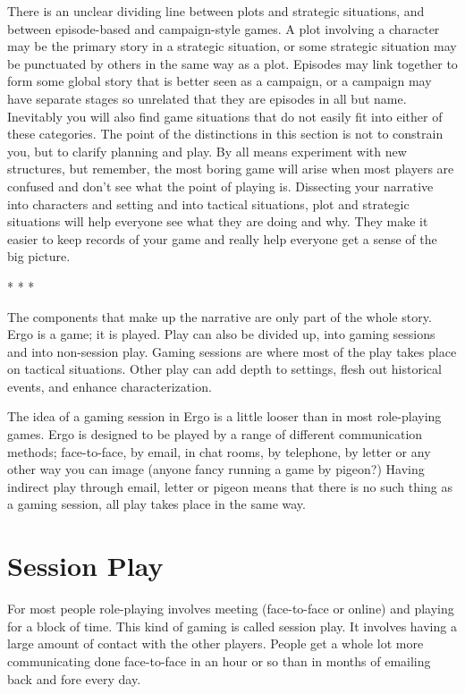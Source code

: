 \documentclass[twoside]{book}
\begin{document}
There is an unclear dividing line between plots and strategic
situations, and between episode-based and campaign-style games. A plot
involving a character may be the primary story in a strategic
situation, or some strategic situation may be punctuated by others in
the same way as a plot. Episodes may link together to form some global
story that is better seen as a campaign, or a campaign may have
separate stages so unrelated that they are episodes in all but
name. Inevitably you will also find game situations that do not easily
fit into either of these categories. The point of the distinctions in
this section is not to constrain you, but to clarify planning and
play. By all means experiment with new structures, but remember, the
most boring game will arise when most players are confused and don't
see what the point of playing is. Dissecting your narrative into
characters and setting and into tactical situations, plot and
strategic situations will help everyone see what they are doing and
why. They make it easier to keep records of your game and really help
everyone get a sense of the big picture.

* * *

The components that make up the narrative are only part of the whole
story. Ergo is a game; it is played. Play can also be divided up, into
gaming sessions and into non-session play. Gaming sessions are where
most of the play takes place on tactical situations. Other play can
add depth to settings, flesh out historical events, and enhance
characterization.

The idea of a gaming session in Ergo is a little looser than in most
role-playing games. Ergo is designed to be played by a range of
different communication methods; face-to-face, by email, in chat
rooms, by telephone, by letter or any other way you can image (anyone
fancy running a game by pigeon?) Having indirect play through email,
letter or pigeon means that there is no such thing as a gaming
session, all play takes place in the same way.

\section{Session Play}

For most people role-playing involves meeting (face-to-face or online)
and playing for a block of time. This kind of gaming is called session
play. It involves having a large amount of contact with the other
players. People get a whole lot more communicating done face-to-face
in an hour or so than in months of emailing back and fore every day.
\end{document}
